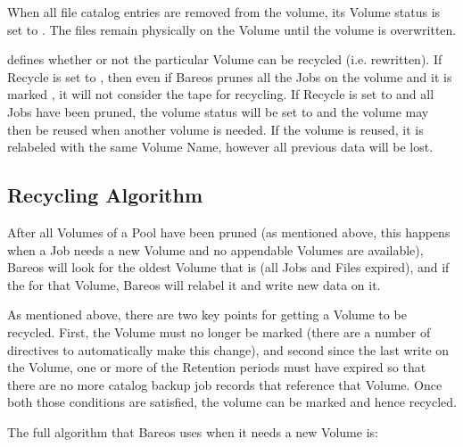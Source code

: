 \begin{description}
   When all file catalog entries are removed from the volume,  its Volume status is
   set to . The files remain physically  on the Volume until the
   volume is overwritten.

\item {}
   defines whether or not the particular Volume can be
   recycled (i.e.  rewritten).  If Recycle is set to ,
   then even if Bareos prunes all the Jobs on the volume and it
   is marked , it will not consider the tape for recycling.  If
   Recycle is set to  and all Jobs have been pruned, the volume
   status will be set to  and the volume may then be reused
   when another volume is needed.  If the volume is reused, it is relabeled
   with the same Volume Name, however all previous data will be lost.
\end{description}


\subsection{Recycling Algorithm}
\label{RecyclingAlgorithm}
\label{Recycling}


After all Volumes of a Pool have been pruned (as mentioned above, this happens
when a Job needs a new Volume and no appendable Volumes are available), Bareos
will look for the oldest Volume that is  (all Jobs and Files expired),
and if the  for that Volume, Bareos will
relabel it and write new data on it.

As mentioned above, there are two key points for getting a Volume
to be recycled. First, the Volume must no longer be marked  (there
are a number of directives to automatically make this change), and second
since the last write on the Volume, one or more of the Retention periods
must have expired so that there are no more catalog backup job records
that reference that Volume.  Once both those conditions are satisfied,
the volume can be marked  and hence recycled.

The full algorithm that Bareos uses when it needs a new Volume is:

